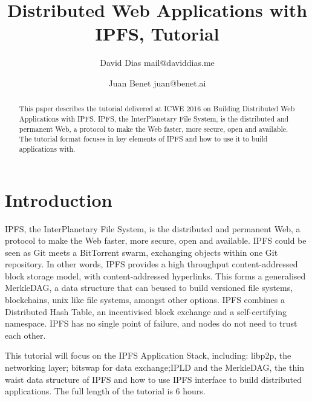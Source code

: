 \documentclass[runningheads,a4paper]{llncs}
\begin{document}
\title{Distributed Web Applications with IPFS, Tutorial}
\author{David Dias mail@daviddias.me \and Juan Benet juan@benet.ai}

\maketitle


\begin{abstract}
This paper describes the tutorial delivered at ICWE 2016 on Building Distributed Web Applications with IPFS\@. IPFS, the InterPlanetary File System, is the distributed and permanent Web, a protocol to make the Web faster, more secure, open and available. The tutorial format focuses in key elements of IPFS and how to use it to build applications with.
\end{abstract}




\section{Introduction}\label{sec:intro}

IPFS, the InterPlanetary File System, is the distributed and permanent Web, a protocol to make the Web faster, more secure, open and available. IPFS could be seen as Git meets a BitTorrent swarm, exchanging objects within one Git repository. In other words, IPFS provides a high throughput content-addressed block storage model, with content-addressed hyperlinks. This forms a generalised MerkleDAG, a data structure that can beused to build versioned file systems, blockchains, unix like file systems, amongst other options. IPFS combines a Distributed Hash Table, an incentivised block exchange and a self-certifying namespace. IPFS has no single point of failure, and nodes do not need to trust each other.

This tutorial will focus on the IPFS Application Stack, including: libp2p, the networking layer; bitswap for data exchange;IPLD and the MerkleDAG, the thin waist data structure of IPFS and how to use IPFS interface to build distributed applications. The full length of the tutorial is 6 hours.
\end{document}

